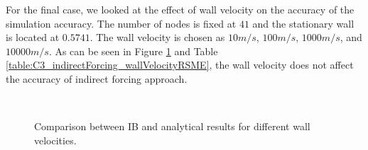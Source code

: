 For the final case, we looked at the effect of wall velocity on the accuracy of the simulation accuracy. The number of nodes is fixed at $41$ and the stationary wall is located at $0.5741$. The wall velocity is chosen as $10 m/s$, $100 m/s$, $1000 m/s$, and $10000 m/s$. As can be seen in Figure \ref{fig:C3_indirectForcing_wallVelocity} and Table \ref{table:C3_indirectForcing_wallVelocityRSME}, the wall velocity does not affect the accuracy of indirect forcing approach.

\begin{figure}[H]
	\centering
	\quad
	\\
	\quad
	\caption{Comparison between IB and analytical results for different wall velocities.}
	\label{fig:C3_indirectForcing_wallVelocity}
\end{figure}

